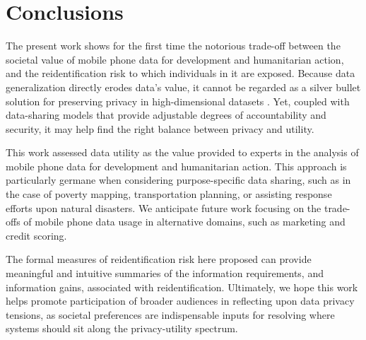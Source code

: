 \documentclass[12pt]{article}
\begin{document}
 
\section{Conclusions}
\vspace{8pt}

The present work shows for the first time the notorious trade-off between the societal value of mobile phone data for development and humanitarian action, and the reidentification risk to which individuals in it are exposed. Because data generalization directly erodes data's value, it cannot be regarded as a silver bullet solution for preserving privacy in high-dimensional datasets \cite{narayanan2014no}. Yet, coupled with data-sharing models that provide adjustable degrees of accountability and security, it may help find the right balance between privacy and utility.

This work assessed data utility as the value provided to experts in the analysis of mobile phone data for development and humanitarian action. This approach is particularly germane when considering purpose-specific data sharing, such as in the case of poverty mapping, transportation planning, or assisting response efforts upon natural disasters. We anticipate future work focusing on the trade-offs of mobile phone data usage in alternative domains, such as marketing and credit scoring.

The formal measures of reidentification risk here proposed can provide meaningful and intuitive summaries of the information requirements, and information gains, associated with reidentification. \iffalse We anticipate information-theoretic extensions of this work, such as development of metrics that capture information continuity along spatiotemporal and social network spaces.\fi
Ultimately, we hope this work helps promote participation of broader audiences in reflecting upon data privacy tensions, as societal preferences are indispensable inputs for resolving where systems should sit along the privacy-utility spectrum.

\iffalse
(Limitations:) This study focuses on mobile phone metadata, hence, although previous results have been shown valid across domains (e.g., across CDRs and credit card records \cite{de2013unique,de2015unique})   further studies are required to extend these conclusions to domains such as credit card, health, and web browsing records.
\fi
\end{document}
